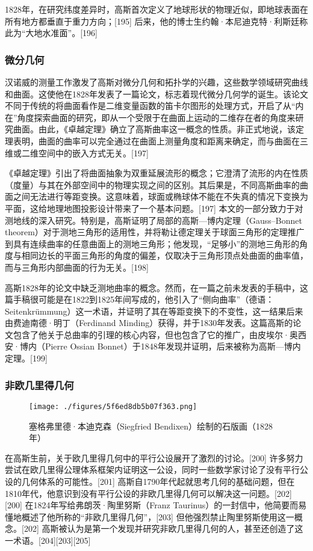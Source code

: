 1828年，在研究纬度差异时，高斯首次定义了地球形状的物理近似，即地球表面在所有地方都垂直于重力方向；[195] 后来，他的博士生约翰·本尼迪克特·利斯廷称此为“大地水准面”。[196]
\subsubsection{微分几何}
汉诺威的测量工作激发了高斯对微分几何和拓扑学的兴趣，这些数学领域研究曲线和曲面。这使他在1828年发表了一篇论文，标志着现代微分几何学的诞生。该论文不同于传统的将曲面看作是二维变量函数的笛卡尔图形的处理方式，开启了从“内在”角度探索曲面的研究，即从一个受限于在曲面上运动的二维存在者的角度来研究曲面。由此，《卓越定理》确立了高斯曲率这一概念的性质。非正式地说，该定理表明，曲面的曲率可以完全通过在曲面上测量角度和距离来确定，而与曲面在三维或二维空间中的嵌入方式无关。[197]

《卓越定理》引出了将曲面抽象为双重延展流形的概念；它澄清了流形的内在性质（度量）与其在外部空间中的物理实现之间的区别。其后果是，不同高斯曲率的曲面之间无法进行等距变换。这意味着，球面或椭球体不能在不失真的情况下变换为平面，这给地理地图投影设计带来了一个基本问题。[197] 本文的一部分致力于对测地线的深入研究。特别是，高斯证明了局部的高斯—博内定理（Gauss–Bonnet theorem）对于测地三角形的适用性，并将勒让德定理关于球面三角形的定理推广到具有连续曲率的任意曲面上的测地三角形；他发现，“足够小”的测地三角形的角度与相同边长的平面三角形的角度的偏差，仅取决于三角形顶点处曲面的曲率值，而与三角形内部曲面的行为无关。[198]

高斯1828年的论文中缺乏测地曲率的概念。然而，在一篇之前未发表的手稿中，这篇手稿很可能是在1822到1825年间写成的，他引入了“侧向曲率”（德语：Seitenkrümmung）这一术语，并证明了其在等距变换下的不变性，这一结果后来由费迪南德·明丁（Ferdinand Minding）获得，并于1830年发表。这篇高斯的论文包含了他关于总曲率的引理的核心内容，但也包含了它的推广，由皮埃尔·奥西安·博内（Pierre Ossian Bonnet）于1848年发现并证明，后来被称为高斯—博内定理。[199]
\subsubsection{非欧几里得几何}
\begin{figure}[ht]
\centering
\texttt{[image: ./figures/5f6ed8db5b07f363.png]}
\caption{塞格弗里德·本迪克森（Siegfried Bendixen）绘制的石版画（1828年）} \label{fig_KRGS_19}
\end{figure}
在高斯生前，关于欧几里得几何中的平行公设展开了激烈的讨论。[200] 许多努力尝试在欧几里得公理体系框架内证明这一公设，同时一些数学家讨论了没有平行公设的几何体系的可能性。[201] 高斯自1790年代起就思考几何的基础问题，但在1810年代，他意识到没有平行公设的非欧几里得几何可以解决这一问题。[202][200] 在1824年写给弗朗茨·陶里努斯（Franz Taurinus）的一封信中，他简要而易懂地概述了他所称的“非欧几里得几何”，[203] 但他强烈禁止陶里努斯使用这一概念。[202] 高斯被认为是第一个发现并研究非欧几里得几何的人，甚至还创造了这一术语。[204][203][205]


